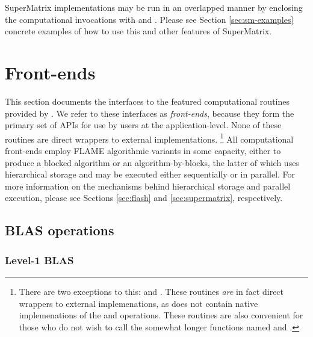 SuperMatrix implementations may be run in an overlapped manner by enclosing
the computational invocations with \flashqueuebegin and
\flashqueueendns.
Please see Section \ref{sec:sm-examples} concrete examples of how to
use this and other features of SuperMatrix.










\section{Front-ends}
\label{sec:front-ends}





This section documents the interfaces to the featured computational routines 
provided by \libflamens.
We refer to these interfaces as {\em front-ends}, because they form the
primary set of APIs for use by users at the application-level.
None of these routines are direct wrappers to external implementations.%
\footnote{
There are two exceptions to this: \flatrmmsx and \flatrsmsxns.
These routines {\em are} in fact direct wrappers to external implemenations,
as \libflame does not contain native implemenations of the \trmmsx and
\trsmsx operations.
These routines are also convenient for those who do not wish to call the
somewhat longer functions named \flatrmmsxext and \flatrsmsxextns.
}
All computational front-ends employ FLAME algorithmic variants in some
capacity, either to produce a blocked algorithm or an algorithm-by-blocks,
the latter of which uses hierarchical storage and may be executed either
sequentially or in parallel.
For more information on the mechanisms behind hierarchical storage and
parallel execution, please see
Sections \ref{sec:flash} and \ref{sec:supermatrix}, respectively.

\subsection{BLAS operations}



\subsubsection{Level-1 BLAS}


